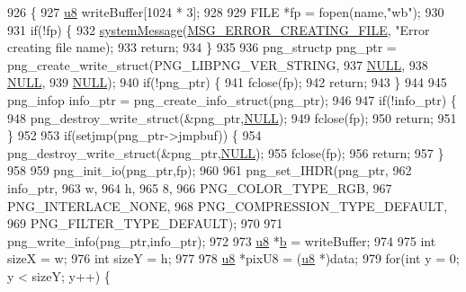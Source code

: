 \begin{DoxyCode}
926 \{
927   \mbox{\hyperlink{_system_8h_aed742c436da53c1080638ce6ef7d13de}{u8}} writeBuffer[1024 * 3];
928   
929   FILE *fp = fopen(name,\textcolor{stringliteral}{"wb"});
930 
931   \textcolor{keywordflow}{if}(!fp) \{
932     \mbox{\hyperlink{system_8cpp_a747a9cb8e015a3d45cca636b5bd0fc69}{systemMessage}}(\mbox{\hyperlink{_n_l_s_8h_a165f1f2539e202f0a24e6e9583c63475}{MSG\_ERROR\_CREATING\_FILE}}, \textcolor{stringliteral}{"Error creating file %
      name);
933     \textcolor{keywordflow}{return};
934   \}
935   
936   png\_structp png\_ptr = png\_create\_write\_struct(PNG\_LIBPNG\_VER\_STRING,
937                                                 \mbox{\hyperlink{getopt1_8c_a070d2ce7b6bb7e5c05602aa8c308d0c4}{NULL}},
938                                                 \mbox{\hyperlink{getopt1_8c_a070d2ce7b6bb7e5c05602aa8c308d0c4}{NULL}},
939                                                 \mbox{\hyperlink{getopt1_8c_a070d2ce7b6bb7e5c05602aa8c308d0c4}{NULL}});
940   \textcolor{keywordflow}{if}(!png\_ptr) \{
941     fclose(fp);
942     \textcolor{keywordflow}{return};
943   \}
944 
945   png\_infop info\_ptr = png\_create\_info\_struct(png\_ptr);
946 
947   \textcolor{keywordflow}{if}(!info\_ptr) \{
948     png\_destroy\_write\_struct(&png\_ptr,\mbox{\hyperlink{getopt1_8c_a070d2ce7b6bb7e5c05602aa8c308d0c4}{NULL}});
949     fclose(fp);
950     \textcolor{keywordflow}{return};
951   \}
952 
953   \textcolor{keywordflow}{if}(setjmp(png\_ptr->jmpbuf)) \{
954     png\_destroy\_write\_struct(&png\_ptr,\mbox{\hyperlink{getopt1_8c_a070d2ce7b6bb7e5c05602aa8c308d0c4}{NULL}});
955     fclose(fp);
956     \textcolor{keywordflow}{return};
957   \}
958 
959   png\_init\_io(png\_ptr,fp);
960 
961   png\_set\_IHDR(png\_ptr,
962                info\_ptr,
963                w,
964                h,
965                8,
966                PNG\_COLOR\_TYPE\_RGB,
967                PNG\_INTERLACE\_NONE,
968                PNG\_COMPRESSION\_TYPE\_DEFAULT,
969                PNG\_FILTER\_TYPE\_DEFAULT);
970 
971   png\_write\_info(png\_ptr,info\_ptr);
972 
973   \mbox{\hyperlink{_system_8h_aed742c436da53c1080638ce6ef7d13de}{u8}} *\mbox{\hyperlink{expr-lex_8cpp_a91b64995742fd30063314f12340b4b5a}{b}} = writeBuffer;
974 
975   \textcolor{keywordtype}{int} sizeX = w;
976   \textcolor{keywordtype}{int} sizeY = h;
977 
978   \mbox{\hyperlink{_system_8h_aed742c436da53c1080638ce6ef7d13de}{u8}} *pixU8 = (\mbox{\hyperlink{_system_8h_aed742c436da53c1080638ce6ef7d13de}{u8}} *)data;
979   \textcolor{keywordflow}{for}(\textcolor{keywordtype}{int} y = 0; y < sizeY; y++) \{
}
\end{DoxyCode}
